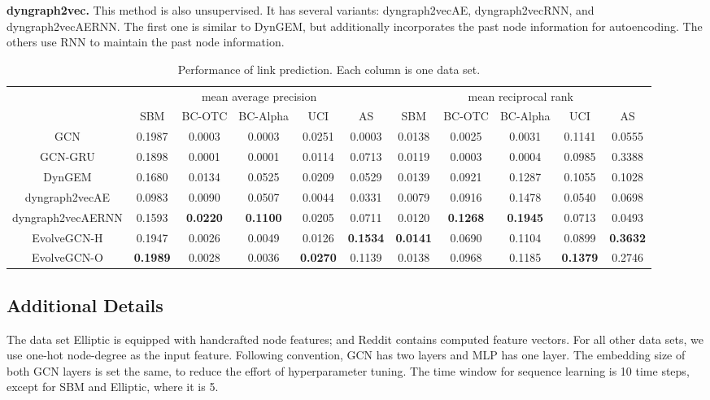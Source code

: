 \documentclass[letterpaper]{article} %
\begin{document}
\vskip5pt \noindent
\textbf{dyngraph2vec.} \cite{Goyal2019}
This method is also unsupervised. It has several variants: dyngraph2vecAE, dyngraph2vecRNN, and dyngraph2vecAERNN. The first one is similar to DynGEM, but additionally incorporates the past node information for autoencoding. The others use RNN to maintain the past node information.


\begin{table}[ht]
\centering
\small
\caption{Performance of link prediction. Each column is one data set.}
\label{tab:link_prediction}
\begin{tabular}{|c|ccccc|ccccc|}
\hline
& \multicolumn{5}{|c|}{mean average precision} & \multicolumn{5}{c|}{mean reciprocal rank} \\
&  SBM & BC-OTC & BC-Alpha & UCI & AS & SBM & BC-OTC & BC-Alpha & UCI & AS \\
\hline
\hline
GCN               & 0.1987 & 0.0003 & 0.0003 & 0.0251 & 0.0003 & 0.0138 & 0.0025 & 0.0031 & 0.1141 & 0.0555 \\
GCN-GRU           & 0.1898 & 0.0001 & 0.0001 & 0.0114 & 0.0713 & 0.0119 & 0.0003 & 0.0004 & 0.0985 & 0.3388 \\
DynGEM            & 0.1680 & 0.0134 & 0.0525 & 0.0209 & 0.0529 & 0.0139 & 0.0921 & 0.1287 & 0.1055 & 0.1028 \\
dyngraph2vecAE    & 0.0983 & 0.0090 & 0.0507 & 0.0044 & 0.0331 & 0.0079 & 0.0916 & 0.1478 & 0.0540 & 0.0698 \\
dyngraph2vecAERNN & 0.1593 & {\bf0.0220} & {\bf0.1100} & 0.0205 & 0.0711 & 0.0120 & {\bf0.1268} & {\bf0.1945} & 0.0713 & 0.0493 \\
EvolveGCN-H       & 0.1947 & 0.0026 & 0.0049 & 0.0126 & {\bf0.1534} & {\bf0.0141} & 0.0690 & 0.1104 & 0.0899 & {\bf0.3632} \\
EvolveGCN-O       & {\bf0.1989} & 0.0028 & 0.0036 & {\bf0.0270} & 0.1139 & 0.0138 & 0.0968 & 0.1185 & {\bf0.1379} & 0.2746 \\
\hline
\end{tabular}
\end{table}


\subsection{Additional Details}
The data set Elliptic is equipped with handcrafted node features; and Reddit contains computed feature vectors. For all other data sets, we use one-hot node-degree as the input feature. Following convention, GCN has two layers and MLP has one layer. The embedding size of both GCN layers is set the same, to reduce the effort of hyperparameter tuning.
The time window for sequence learning is 10 time steps, except for SBM and Elliptic, where it is 5.
\end{document}
